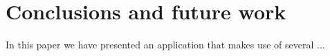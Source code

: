 \section{Conclusions and future work}
In this paper we have presented an application that makes use of several  ...